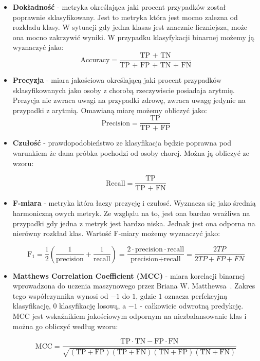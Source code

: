 \documentclass[a4paper,twoside,12pt]{book}
\begin{document}
\begin{itemize}
	\item \textbf{Dokładność} - metryka określająca jaki procent przypadków został poprawnie sklasyfikowany. Jest to metryka która jest mocno zalezna od rozkładu klasy. W sytuacji gdy jedna klasas jest znacznie liczniejsza, może ona mocno zakrzywić wyniki. W przypadku klasyfykacji binarnej możemy ją wyznaczyć jako:
	      \begin{equation}
		      \text{Accuracy} = \frac{\text{TP + TN}}{\text{TP + FP + TN + FN}}
	      \end{equation}

	\item \textbf{Precyzja} - miara jakościowa określającą jaki procent przypadków sklasyfikowanych jako osoby z chorobą rzeczywiscie posiadaja arytmię. Prezycja nie zwraca uwagi na przypadki zdrowę, zwraca uwagę jedynie na przypadki z arytmią. Omawianą miarę możemy obliczyć jako:
	      \begin{equation}
		      \text{Precision} = \frac{\text{TP}}{\text{TP + FP}}
	      \end{equation}

	\item \textbf{Czułość} - prawdopodobieństwo ze klasyfikacja będzie poprawna pod warunkiem że dana próbka pochodzi od osoby chorej. Można ją obliczyć ze wzoru:

	      \begin{equation}
		      \text{Recall} = \frac{\text{TP}}{\text{TP + FN}}
	      \end{equation}


	\item \textbf{F-miara} - metryka która łaczy prezycję i czułosć. Wyznacza się jako średnią harmoniczną owych metryk. Ze względu na to, jest ona bardzo wrażliwa na przypadki gdy jedna z metryk jest bardzo niska. Jednak jest ona odporna na nierówny rozkład klas. Wartość F-miary możemy wyznaczyć jako:

	      \begin{equation}
		      \text{F}_1 = \frac{1}{2} \left( \frac{1}{\text{precision}} + \frac{1}{\text{recall}} \right) = \frac{2 \cdot \text{precision} \cdot \text{recall}}{\text{precision} + \text{recall}} = \frac{2TP}{2TP + FP + FN}
	      \end{equation}


	\item \textbf{Matthews Correlation Coefficient (MCC)} - miara korelacji binarnej wprowadzona do uczenia maszynowego przez Briana W. Matthewsa~\cite{matthews1975}. Zakres tego współczynnika wynosi od $-1$ do $1$, gdzie $1$ oznacza perfekcyjną klasyfikację, $0$ klasyfikację losową, a $-1$ - całkowicie odwrotną predykcję. MCC jest wskaźnikiem jakościowym odpornym na niezbalansowanie klas i można go obliczyć według wzoru:

	      \begin{equation}
		      \text{MCC} = \frac{\text{TP} \cdot \text{TN} - \text{FP} \cdot \text{FN}}{\sqrt{(\text{TP} + \text{FP})(\text{TP} + \text{FN})(\text{TN} + \text{FP})(\text{TN} + \text{FN})}}
	      \end{equation}
\end{itemize}
\end{document}
